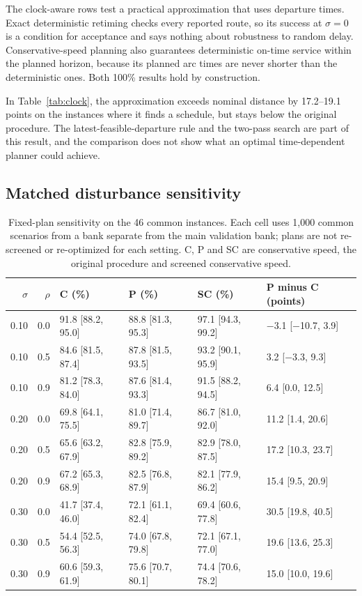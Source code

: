 The clock-aware rows test a practical approximation that uses departure times. Exact deterministic retiming checks every reported route, so its success at $\sigma=0$ is a condition for acceptance and says nothing about robustness to random delay. Conservative-speed planning also guarantees deterministic on-time service within the planned horizon, because its planned arc times are never shorter than the deterministic ones. Both 100\% results hold by construction.

In Table~\ref{tab:clock}, the approximation exceeds nominal distance by 17.2--19.1 points on the instances where it finds a schedule, but stays below the original procedure. The latest-feasible-departure rule and the two-pass search are part of this result, and the comparison does not show what an optimal time-dependent planner could achieve.

\subsection{Matched disturbance sensitivity}

\begin{table}[htbp]
\centering
\scriptsize
\caption{Fixed-plan sensitivity on the 46 common instances. Each cell uses 1,000 common scenarios from a bank separate from the main validation bank; plans are not re-screened or re-optimized for each setting. C, P and SC are conservative speed, the original procedure and screened conservative speed.}
\label{tab:sensitivity}
\begin{tabular}{rrllll}
\toprule
$\sigma$ & $\rho$ & C (\%) & P (\%) & SC (\%) & P minus C (points)\\
\midrule
0.10 & 0.0 & 91.8 [88.2, 95.0] & 88.8 [81.3, 95.3] & 97.1 [94.3, 99.2] & $-$3.1 [$-$10.7, 3.9]\\
0.10 & 0.5 & 84.6 [81.5, 87.4] & 87.8 [81.5, 93.5] & 93.2 [90.1, 95.9] & 3.2 [$-$3.3, 9.3]\\
0.10 & 0.9 & 81.2 [78.3, 84.0] & 87.6 [81.4, 93.3] & 91.5 [88.2, 94.5] & 6.4 [0.0, 12.5]\\
0.20 & 0.0 & 69.8 [64.1, 75.5] & 81.0 [71.4, 89.7] & 86.7 [81.0, 92.0] & 11.2 [1.4, 20.6]\\
0.20 & 0.5 & 65.6 [63.2, 67.9] & 82.8 [75.9, 89.2] & 82.9 [78.0, 87.5] & 17.2 [10.3, 23.7]\\
0.20 & 0.9 & 67.2 [65.3, 68.9] & 82.5 [76.8, 87.9] & 82.1 [77.9, 86.2] & 15.4 [9.5, 20.9]\\
0.30 & 0.0 & 41.7 [37.4, 46.0] & 72.1 [61.1, 82.4] & 69.4 [60.6, 77.8] & 30.5 [19.8, 40.5]\\
0.30 & 0.5 & 54.4 [52.5, 56.3] & 74.0 [67.8, 79.8] & 72.1 [67.1, 77.0] & 19.6 [13.6, 25.3]\\
0.30 & 0.9 & 60.6 [59.3, 61.9] & 75.6 [70.7, 80.1] & 74.4 [70.6, 78.2] & 15.0 [10.0, 19.6]\\
\bottomrule
\end{tabular}
\end{table}


